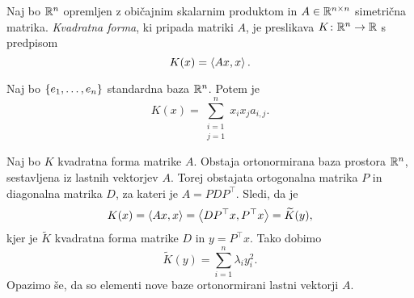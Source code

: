 \documentclass[12pt, a4paper]{article}
\begin{document}
\begin{definicija}
Naj bo $\mathbb{R}^n$ opremljen z običajnim skalarnim produktom in $A\in\mathbb{R}^{n\times n}$ simetrična matrika. \emph{Kvadratna forma}, ki pripada matriki $A$, je preslikava $K\colon\mathbb{R}^n\to\mathbb{R}$ s predpisom
\[
K(x)=\left\langle Ax,x\right\rangle.
\]
\end{definicija}

\begin{opomba}
Naj bo $\left\{e_1,\dots,e_n\right\}$ standardna baza $\mathbb{R}^n$. Potem je
\[
K(x)=\sum_{\substack{i=1 \\ j=1}}^n x_ix_ja_{i,j}.
\]
\end{opomba}

\begin{opomba}
Naj bo $K$ kvadratna forma matrike $A$. Obstaja ortonormirana baza prostora $\mathbb{R}^n$, sestavljena iz lastnih vektorjev $A$. Torej obstajata ortogonalna matrika $P$ in diagonalna matrika $D$, za kateri je $A=PDP^\top$. Sledi, da je
\[
K(x)=\left\langle Ax,x\right\rangle=\left\langle DP^\top x,P^\top x\right\rangle=\widetilde{K}(y),
\]
kjer je $\widetilde{K}$ kvadratna forma matrike $D$ in $y=P^\top x$. Tako dobimo
\[
\widetilde{K}(y)=\sum_{i=1}^n\lambda_i y_i^2.
\]
Opazimo še, da so elementi nove baze ortonormirani lastni vektorji $A$.
\end{opomba}


\newpage
\printindex
\end{document}
